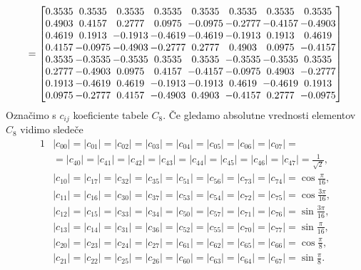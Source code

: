 \documentclass[a4paper,12pt,openright]{book}
\begin{document}
\begin{gather*}
   =
 \setlength{\arraycolsep}{1pt}
 \renewcommand{\arraystretch}{1}
 \begin{bmatrix}
    0.3535&  0.3535&  0.3535&  0.3535&  0.3535&  0.3535&  0.3535&  0.3535\\
    0.4903&  0.4157&  0.2777&  0.0975& -0.0975& -0.2777& -0.4157& -0.4903\\
    0.4619&  0.1913& -0.1913& -0.4619& -0.4619& -0.1913&  0.1913&  0.4619\\
    0.4157& -0.0975& -0.4903& -0.2777&  0.2777&  0.4903&  0.0975& -0.4157\\
    0.3535& -0.3535& -0.3535&  0.3535&  0.3535& -0.3535& -0.3535&  0.3535\\
    0.2777& -0.4903&  0.0975&  0.4157& -0.4157& -0.0975&  0.4903& -0.2777\\
    0.1913& -0.4619&  0.4619& -0.1913& -0.1913&  0.4619& -0.4619&  0.1913\\
    0.0975& -0.2777&  0.4157& -0.4903&  0.4903& -0.4157&  0.2777& -0.0975\\
 \end{bmatrix}
\end{gather*}
Označimo s $c_{ij}$ koeficiente tabele $C_8$. Če gledamo absolutne vrednosti elementov $C_8$ vidimo sledeče
\begin{alignat*}{1}
    & |c_{00}| = |c_{01}| = |c_{02}| = |c_{03}| = |c_{04}| = |c_{05}| = |c_{06}| = |c_{07}| = \\
    &  = |c_{40}| = |c_{41}| = |c_{42}| = |c_{43}| = |c_{44}| = |c_{45}| = |c_{46}| = |c_{47}| = \frac{1}{\sqrt{2}},\\
    & |c_{10}| = |c_{17}| = |c_{32}| = |c_{35}| = |c_{51}| = |c_{56}| = |c_{73}| = |c_{74}| = \cos{\frac{\pi}{16}},\\
    & |c_{11}| = |c_{16}| = |c_{30}| = |c_{37}| = |c_{53}| = |c_{54}| = |c_{72}| = |c_{75}| = \cos{\frac{3\pi}{16}},\\
    & |c_{12}| = |c_{15}| = |c_{33}| = |c_{34}| = |c_{50}| = |c_{57}| = |c_{71}| = |c_{76}| = \sin{\frac{3\pi}{16}},\\
    & |c_{13}| = |c_{14}| = |c_{31}| = |c_{36}| = |c_{52}| = |c_{55}| = |c_{70}| = |c_{77}| = \sin{\frac{\pi}{16}},\\
    & |c_{20}| = |c_{23}| = |c_{24}| = |c_{27}| = |c_{61}| = |c_{62}| = |c_{65}| = |c_{66}| = \cos{\frac{\pi}{8}},\\
    & |c_{21}| = |c_{22}| = |c_{25}| = |c_{26}| = |c_{60}| = |c_{63}| = |c_{64}| = |c_{67}| = \sin{\frac{\pi}{8}}.
\end{alignat*}
\end{document}
